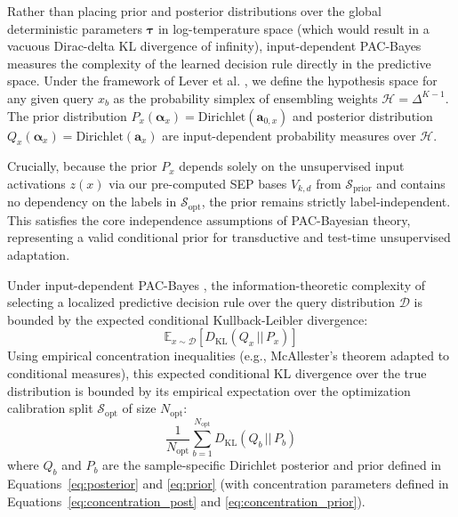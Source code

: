 Rather than placing prior and posterior distributions over the global deterministic parameters $\boldsymbol{\tau}$ in log-temperature space (which would result in a vacuous Dirac-delta KL divergence of infinity), input-dependent PAC-Bayes measures the complexity of the learned decision rule directly in the predictive space. Under the framework of Lever et al. \cite{lever2013tighter}, we define the hypothesis space for any given query $x_b$ as the probability simplex of ensembling weights $\mathcal{H} = \Delta^{K-1}$. The prior distribution $P_x(\boldsymbol{\alpha}_x) = \text{Dirichlet}(\mathbf{a}_{0, x})$ and posterior distribution $Q_x(\boldsymbol{\alpha}_x) = \text{Dirichlet}(\mathbf{a}_x)$ are input-dependent probability measures over $\mathcal{H}$. 

Crucially, because the prior $P_x$ depends solely on the unsupervised input activations $z(x)$ via our pre-computed SEP bases $V_{k, d}$ from $\mathcal{S}_{\text{prior}}$ and contains no dependency on the labels in $\mathcal{S}_{\text{opt}}$, the prior remains strictly label-independent. This satisfies the core independence assumptions of PAC-Bayesian theory, representing a valid conditional prior for transductive and test-time unsupervised adaptation.

Under input-dependent PAC-Bayes \cite{lever2013tighter}, the information-theoretic complexity of selecting a localized predictive decision rule over the query distribution $\mathcal{D}$ is bounded by the expected conditional Kullback-Leibler divergence:
\begin{equation}
  \mathbb{E}_{x \sim \mathcal{D}} \left[ D_{\text{KL}}(Q_x \,||\, P_x) \right]
\end{equation}
Using empirical concentration inequalities (e.g., McAllester's theorem \cite{mcallester1999pac, mcallester2003simplified} adapted to conditional measures), this expected conditional KL divergence over the true distribution is bounded by its empirical expectation over the optimization calibration split $\mathcal{S}_{\text{opt}}$ of size $N_{\text{opt}}$:
\begin{equation}
  \frac{1}{N_{\text{opt}}} \sum_{b=1}^{N_{\text{opt}}} D_{\text{KL}}(Q_b \,||\, P_b)
  \label{eq:joint_kl}
\end{equation}
where $Q_b$ and $P_b$ are the sample-specific Dirichlet posterior and prior defined in Equations~\eqref{eq:posterior} and \eqref{eq:prior} (with concentration parameters defined in Equations~\eqref{eq:concentration_post} and \eqref{eq:concentration_prior}). 

